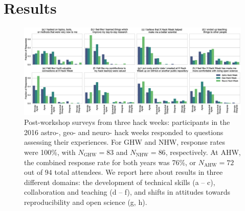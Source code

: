 \section*{Results}

\begin{figure}[h!]
\centering
\includegraphics[width=\textwidth]{f2.eps}
\caption{Post-workshop surveys from three hack weeks: participants in the 2016 astro-, geo- and neuro- hack weeks responded to questions assessing their experiences. For GHW and NHW, response rates were 100\%, with $N_{\mathrm{GHW}}= 83$ and $N_{\mathrm{NHW}} = 86$, respectively. At AHW, the combined response rate for both years was 76\%, or $N_{\mathrm{AHW}} = 72$ out of $94$ total attendees. We report here about results in three different domains: the development of technical skills (a -- c), collaboration and teaching (d -- f), and shifts in attitudes towards reproducibility and open science (g, h).}
\label{fig:survey}
\end{figure}

